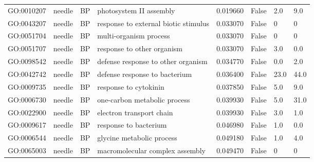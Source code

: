 \begin{longtable}{llllrl}
GO:0010207 & needle & BP &   photosystem II assembly  & 0.019660 &   False  & 2.0 & 9.0 \\ 
GO:0043207 & needle & BP &   response to external biotic stimulus  & 0.033070 &   False  & 0 & 0 \\
GO:0051704 & needle & BP &   multi-organism process  & 0.033070 &   False  & 0 & 0 \\
GO:0051707 & needle & BP &   response to other organism  & 0.033070 &   False  & 3.0 & 0.0 \\ 
GO:0098542 & needle & BP &   defense response to other organism  & 0.034770 &   False  & 0.0 & 2.0 \\ 
GO:0042742 & needle & BP &   defense response to bacterium  & 0.036400 &   False  & 23.0 & 44.0 \\ 
GO:0009735 & needle & BP &   response to cytokinin  & 0.037850 &   False  & 5.0 & 9.0 \\ 
GO:0006730 & needle & BP &   one-carbon metabolic process  & 0.039930 &   False  & 5.0 & 31.0 \\ 
GO:0022900 & needle & BP &   electron transport chain  & 0.039930 &   False  & 3.0 & 1.0 \\ 
GO:0009617 & needle & BP &   response to bacterium  & 0.046980 &   False  & 1.0 & 0.0 \\ 
GO:0006544 & needle & BP &   glycine metabolic process  & 0.049180 &   False  & 1.0 & 4.0 \\ 
GO:0065003 & needle & BP &   macromolecular complex assembly  & 0.049470 &   False  & 0 & 0 \\
\bottomrule
\end{longtable}
